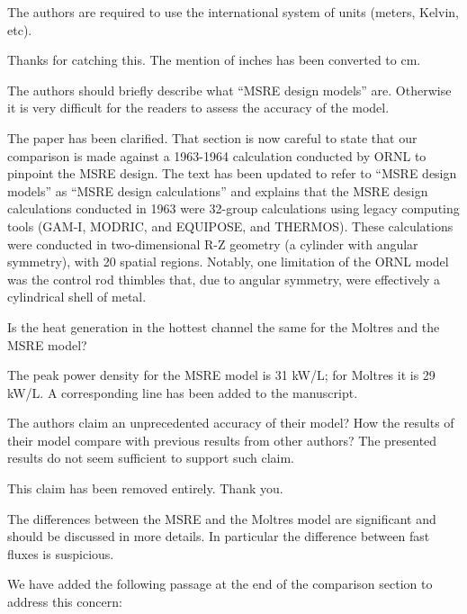 \documentclass[answers,11pt]{exam}
\begin{document}
\begin{questions}
\question The authors are required to use the international system of units (meters, Kelvin, etc).
\begin{solution}
        Thanks for catching this. The mention of inches has been converted to cm.
\end{solution}

\question The authors should briefly describe what ``MSRE design models''
are. Otherwise it is very difficult for the readers to assess the accuracy of
the model.
\begin{solution}
        The paper has been clarified. That section is now careful to state that
        our comparison is made against a 1963-1964 calculation conducted by ORNL
        to pinpoint the MSRE design. The text has been updated to refer to
        ``MSRE design models'' as ``MSRE design calculations'' and explains
        that the MSRE design calculations conducted in 1963 were 32-group
        calculations using legacy computing tools (GAM-I, MODRIC, and EQUIPOSE,
        and THERMOS). These calculations were conducted in two-dimensional R-Z
        geometry (a cylinder with angular symmetry), with 20 spatial regions.
        Notably, one limitation of the ORNL model was the control rod thimbles
        that, due to angular symmetry, were effectively a cylindrical shell of
        metal.
\end{solution}

\question Is the heat generation in the hottest channel the same for the Moltres and the MSRE model?
\begin{solution}
        The peak power density for the MSRE model is 31 kW/L; for Moltres it is
        29 kW/L. A corresponding line has been added to the manuscript.
\end{solution}

\question The authors claim an unprecedented accuracy of their model? How the
results of their model compare with previous results from other authors? The
presented results do not seem sufficient to support such claim.
\begin{solution}
        This claim has been removed entirely. Thank you.
\end{solution}

\question The differences between the MSRE and the Moltres model are significant
and should be discussed in more details. In particular the difference between
fast fluxes is suspicious.
\begin{solution}
        We have added the following passage at the end of the comparison section
        to address this concern:


\end{solution}
\end{questions}
\end{document}
